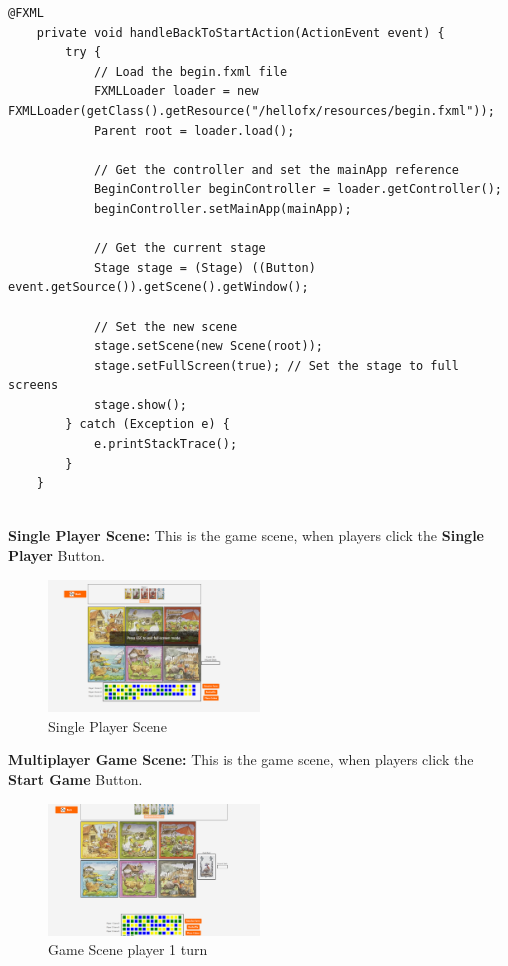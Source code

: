\documentclass[conference]{IEEEtran}
\begin{document}
\begin{lstlisting}[language = FXML, caption = Back to Start Button, basicstyle=\scriptsize, frame=single, framesep=1pt, framerule=0.5pt, xleftmargin=8pt, xrightmargin=8pt]
    @FXML
    private void handleBackToStartAction(ActionEvent event) {
        try {
            // Load the begin.fxml file
            FXMLLoader loader = new FXMLLoader(getClass().getResource("/hellofx/resources/begin.fxml"));
            Parent root = loader.load();

            // Get the controller and set the mainApp reference
            BeginController beginController = loader.getController();
            beginController.setMainApp(mainApp);

            // Get the current stage
            Stage stage = (Stage) ((Button) event.getSource()).getScene().getWindow();

            // Set the new scene
            stage.setScene(new Scene(root));
            stage.setFullScreen(true); // Set the stage to full screens
            stage.show();
        } catch (Exception e) {
            e.printStackTrace();
        }
    }
    
\end{lstlisting}

\vspace{1.5cm}
\textbf{Single Player Scene: }
This is the game scene, when players click the \textbf{Single Player} Button.

\begin{figure}[h!]
    \centering
    \includegraphics[width=0.5\textwidth]{img/Screenshot 2025-01-17 150553.png} %
    \caption{Single Player Scene}
    \label{fig:game-scene}
\end{figure}

\vspace{1cm}

\textbf{Multiplayer Game Scene: }
This is the game scene, when players click the \textbf{Start Game} Button.
\begin{figure}[h!]
    \centering
    \includegraphics[width=0.5\textwidth]{img/Screenshot 2025-01-14 113548.png} %
    \caption{Game Scene player 1 turn}
    \label{fig:game-scene}
\end{figure}
\end{document}
